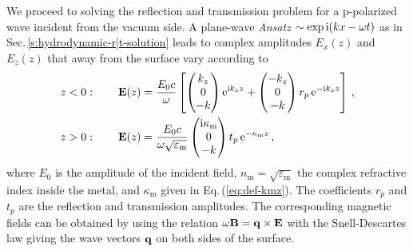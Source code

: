 \documentclass[11pt, oneside]{article}   	%
\newcommand{\bulk}[1]{_{\mathrm{#1}}}
\begin{document}
We proceed to solving the reflection and transmission problem for a p-polarized
wave incident from the vacuum side. A plane-wave \emph{Ansatz} $\sim \exp{\rm i}(k x - \omega t)$
as in Sec.\,\ref{s:hydrodynamic-r|t-solution} leads to complex amplitudes $E_x(z)$
and $E_z(z)$ that away from the surface vary according to
\begin{align}
z < 0: \qquad {\bf E}(z) & = \frac{E_0 c}{\omega} \left[       
\begin{pmatrix}
k_z \\ 0 \\ -k
\end{pmatrix} {\rm e}^{ {\rm i} k_z z} 
+ \begin{pmatrix}
- k_z \\ 0 \\ -k
\end{pmatrix} r_p \, {\rm e}^{-{\rm i} k_z z} \right] \, ,
\\
z > 0: \qquad 
{\bf E}(z) & = \frac{E_0 c}{\omega \sqrt{ \varepsilon\bulk{m} }}      
\begin{pmatrix}
{\rm i}  \kappa\bulk{m} \\ 0 \\ -k
\end{pmatrix} 
t_p\, {\rm e}^{ - \kappa\bulk{m} z} \, , 
\end{align}
where $E_0$ is the amplitude of the incident field,
$n\bulk{m} = \sqrt{\varepsilon\bulk{m}}$ the complex refractive index inside the metal,
and $\kappa\bulk{m}$ given in Eq.\,(\ref{eq:def-kmz}).
The coefficients $r_p$ and $t_p$ are the reflection and transmission amplitudes. 
The corresponding magnetic fields can be obtained by using the relation 
$\omega {\bf B} = {\bf q} \times {\bf E}$ with the Snell-Descartes law giving the wave vectors 
${\bf q}$ on both sides of the surface.
\end{document}
